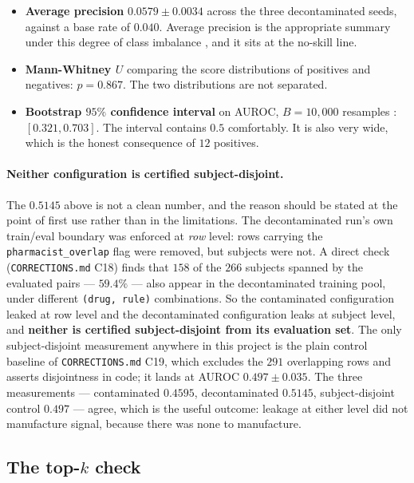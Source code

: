 \begin{itemize}
\item \textbf{Average precision} $0.0579 \pm 0.0034$ across the three
      decontaminated seeds, against a base rate of $0.040$. Average precision is
      the appropriate summary under this degree of class imbalance
      \citep{saito2015prcurve}, and it sits at the no-skill line.
\item \textbf{Mann-Whitney $U$} comparing the score distributions of positives
      and negatives: $p = 0.867$. The two distributions are not separated.
\item \textbf{Bootstrap $95\%$ confidence interval} on AUROC, $B = 10{,}000$
      resamples \citep{efron1994bootstrap}: $[0.321, 0.703]$. The interval
      contains $0.5$ comfortably. It is also very wide, which is the honest
      consequence of $12$ positives.
\end{itemize}

\paragraph{Neither configuration is certified subject-disjoint.} The $0.5145$
above is not a clean number, and the reason should be stated at the point of
first use rather than in the limitations. The decontaminated run's own
train/eval boundary was enforced at \emph{row} level: rows carrying the
\texttt{pharmacist\_overlap} flag were removed, but subjects were not. A direct
check (\texttt{CORRECTIONS.md} C18) finds that $158$ of the $266$ subjects
spanned by the evaluated pairs --- $59.4\%$ --- also appear in the
decontaminated training pool, under different \texttt{(drug, rule)}
combinations. So the contaminated configuration leaked at row level and the
decontaminated configuration leaks at subject level, and \textbf{neither is
certified subject-disjoint from its evaluation set}. The only subject-disjoint
measurement anywhere in this project is the plain control baseline of
\texttt{CORRECTIONS.md} C19, which excludes the $291$ overlapping rows and
asserts disjointness in code; it lands at AUROC $0.497 \pm 0.035$. The three
measurements --- contaminated $0.4595$, decontaminated $0.5145$, subject-disjoint
control $0.497$ --- agree, which is the useful outcome: leakage at either level
did not manufacture signal, because there was none to manufacture.

\subsection{The top-$k$ check}

